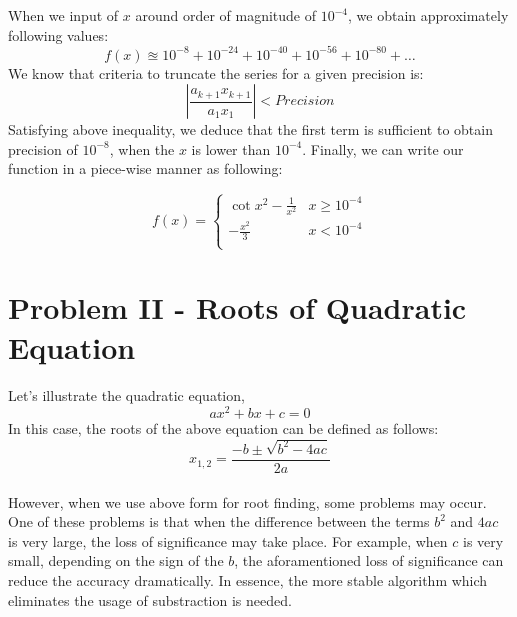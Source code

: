 \documentclass[letterpaper,12pt]{article}
\begin{document}
 When we input of $x$ around order of magnitude of $10^{-4}$, we obtain approximately following values:
 \begin{equation*}
    f(x) \approxeq 10^{-8} + 10^{-24} + 10^{-40} + 10^{-56} + 10^{-80} + \dots 
 \end{equation*}
 We know that criteria to truncate the series for a given precision is:
 \begin{equation*}
    \left\lvert \frac{a_{k+1}x_{k+1}}{a_1x_1} \right\rvert < Precision
 \end{equation*}
 Satisfying above inequality, we deduce that the first term is sufficient to obtain precision of $10^{-8}$, when the $x$ is lower than $10^{-4}$. Finally, we can write our function in a piece-wise manner as following:
 
 \[ f(x) = 
 \begin{cases}
   \cot x^2 - \frac{1}{x^2} & x\geq 10^{-4} \\
   -\frac{x^2}{3} &  x < 10^{-4} \\
       
 \end{cases} 
  \]
 




\section{Problem II - Roots of Quadratic Equation}
\paragraph{}Let's illustrate the quadratic equation, 
\begin{equation*}
   ax^2 + bx + c = 0
\end{equation*}
In this case, the roots of the above equation can be defined as follows:
\begin{equation*}
   x_{1,2} = \frac{-b \pm \sqrt{b^2 - 4ac}}{2a}
\end{equation*}
\paragraph{}However, when we use above form for root finding, some problems may occur. One of these problems is that when the difference between the terms $b^2$ and $4ac$ is very large, the loss of significance may take place. For example, when $c$ is very small, depending on the sign of the $b$, the aforamentioned loss of significance can reduce the accuracy dramatically. In essence, the more stable algorithm which eliminates the usage of substraction is needed.
\end{document}
